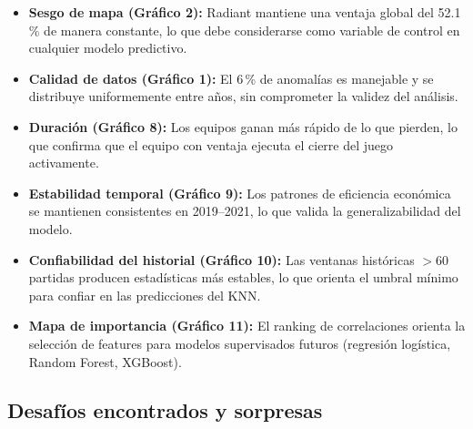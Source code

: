\documentclass[12pt,a4paper]{article}
\begin{document}
\begin{itemize}
  \item \textbf{Sesgo de mapa (Gr\'afico 2):} Radiant mantiene una ventaja global
        del 52.1\,\% de manera constante, lo que debe considerarse como variable
        de control en cualquier modelo predictivo.
  \item \textbf{Calidad de datos (Gr\'afico 1):} El 6\,\% de anomal\'ias es
        manejable y se distribuye uniformemente entre a\~nos, sin comprometer la
        validez del an\'alisis.
  \item \textbf{Duraci\'on (Gr\'afico 8):} Los equipos ganan m\'as r\'apido de
        lo que pierden, lo que confirma que el equipo con ventaja ejecuta el cierre
        del juego activamente.
  \item \textbf{Estabilidad temporal (Gr\'afico 9):} Los patrones de eficiencia
        econ\'omica se mantienen consistentes en 2019--2021, lo que valida
        la generalizabilidad del modelo.
  \item \textbf{Confiabilidad del historial (Gr\'afico 10):} Las ventanas
        hist\'oricas $>$60 partidas producen estad\'isticas m\'as estables,
        lo que orienta el umbral m\'inimo para confiar en las predicciones del KNN.
  \item \textbf{Mapa de importancia (Gr\'afico 11):} El ranking de correlaciones
        orienta la selecci\'on de features para modelos supervisados futuros
        (regresi\'on log\'istica, Random Forest, XGBoost).
\end{itemize}

\subsection*{Desaf\'ios encontrados y sorpresas}
\end{document}
